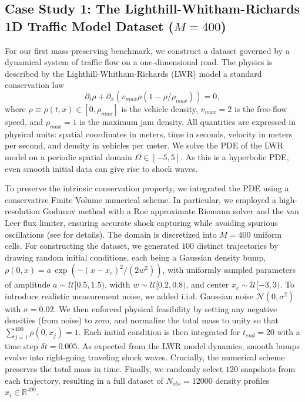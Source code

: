 \documentclass{article}
\begin{document}
\subsection{Case Study 1: The Lighthill-Whitham-Richards 1D Traffic Model Dataset (\texorpdfstring{$M=400$}{M=400})} \label{sb:LWR}
For our first mass-preserving benchmark, we construct a dataset governed by a dynamical system of traffic flow on a one-dimensional road. The physics is described by the Lighthill-Whitham-Richards (LWR) model %
a standard conservation law 
\begin{equation}
    \partial_t \rho + \partial_x (v_{max}\rho(1-\rho/\rho_{max})) = 0,
\end{equation}
where $\rho \equiv \rho(t,x)\in [0, \rho_{max}]$ is the vehicle density, $v_{max}=2$ is the free-flow speed, and $\rho_{max}=1$ is the maximum jam density. All quantities are expressed in physical units: spatial coordinates in meters, time in seconds, velocity in meters per second, and density in vehicles per meter. We solve the PDE of the LWR model on a periodic spatial domain $\Omega \in [-5,5]$. As this is a hyperbolic PDE, even smooth initial data can give rise to shock waves.

To preserve the intrinsic conservation property, we integrated the PDE using a conservative Finite Volume numerical scheme. In particular, we employed a high-resolution Godunov method with a Roe approximate Riemann solver and the van Leer flux limiter, ensuring accurate shock capturing while avoiding spurious oscillations (see \cite{patsatzis2025gorinns} for details). The domain is discretized into $M=400$ uniform cells. For constructing the dataset, we generated $100$ distinct trajectories by drawing random initial conditions, each being a Gaussian density bump, $\rho(0,x) = a \, \exp\left( -(x - x_c)^2 / (2w^2) \right)$, with uniformly sampled parameters of  amplitude $a \sim \mathcal{U}[0.5, 1.5)$, width $w \sim \mathcal{U}[0.2, 0.8)$, and center $x_c \sim \mathcal{U}[-3, 3)$. To introduce realistic measurement noise, we added i.i.d. Gaussian noise $\mathcal{N}(0, \sigma^2)$ with $\sigma=0.02$. We then enforced physical feasibility by setting any negative densities (from noise) to zero, and normalize the total mass to unity so that $\sum_{j=1}^{400} \rho(0, x_j) = 1$. Each initial condition is then integrated for $t_{end} = 20$ with a time step $\delta t = 0.005$. As expected from the LWR model dynamics, smooth bumps evolve into right-going traveling shock waves. Crucially, the numerical scheme preserves the total mass in time. Finally, we randomly select $120$ snapshots from each trajectory, resulting in a full dataset of $N_{obs} = 12000$ density profiles $x_i \in \mathbb{R}^{400}$.
\end{document}
